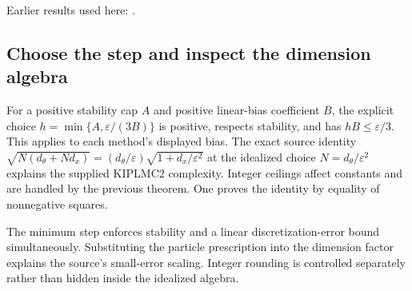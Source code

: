 \documentclass[11pt,a4paper]{report}
\begin{document}
Earlier results used here: \cite[Section~3.98.2]{LangevinLean2026Kinetic}.
\subsection{\texorpdfstring{Choose the step and inspect the dimension algebra}{Choose the step and inspect the dimension algebra}}
\label{report-step-KIPLMC-Accuracy-lean-3}


For a positive stability cap \(A\) and positive linear-bias coefficient \(B\), the explicit choice \(h=\min\{A,\varepsilon/(3B)\}\) is positive, respects stability, and has \(hB\le\varepsilon/3\). This applies to each method’s displayed bias. The exact source identity \(\sqrt{N(d_\theta+Nd_x)}=(d_\theta/\varepsilon)\sqrt{1+d_x/\varepsilon^2}\) at the idealized choice \(N=d_\theta/\varepsilon^2\) explains the supplied KIPLMC2 complexity. Integer ceilings affect constants and are handled by the previous theorem. One proves the identity by equality of nonnegative squares.



The minimum step enforces stability and a linear discretization-error bound simultaneously. Substituting the particle prescription into the dimension factor explains the source’s small-error scaling. Integer rounding is controlled separately rather than hidden inside the idealized algebra.
\end{document}
